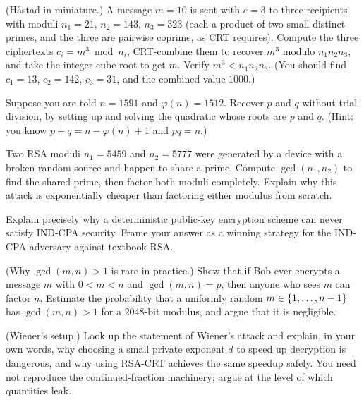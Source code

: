 \begin{exercise}
(H\r{a}stad in miniature.) A message $m=10$ is sent with $e=3$ to three recipients with moduli $n_1=21$, $n_2=143$, $n_3=323$ (each a product of two small distinct primes, and the three are pairwise coprime, as CRT requires). Compute the three ciphertexts $c_i = m^3\bmod n_i$, CRT-combine them to recover $m^3$ modulo $n_1 n_2 n_3$, and take the integer cube root to get $m$. Verify $m^3 < n_1 n_2 n_3$. (You should find $c_1=13$, $c_2=142$, $c_3=31$, and the combined value $1000$.)
\end{exercise}

\begin{exercise}
Suppose you are told $n=1591$ and $\varphi(n)=1512$. Recover $p$ and $q$ without trial division, by setting up and solving the quadratic whose roots are $p$ and $q$. (Hint: you know $p+q = n-\varphi(n)+1$ and $pq=n$.)
\end{exercise}

\begin{exercise}
Two RSA moduli $n_1 = 5459$ and $n_2 = 5777$ were generated by a device with a broken random source and happen to share a prime. Compute $\gcd(n_1,n_2)$ to find the shared prime, then factor both moduli completely. Explain why this attack is exponentially cheaper than factoring either modulus from scratch.
\end{exercise}

\begin{exercise}
Explain precisely why a deterministic public-key encryption scheme can never satisfy IND-CPA security. Frame your answer as a winning strategy for the IND-CPA adversary against textbook RSA.
\end{exercise}

\begin{exercise}
(Why $\gcd(m,n)>1$ is rare in practice.) Show that if Bob ever encrypts a message $m$ with $0 < m < n$ and $\gcd(m,n)=p$, then anyone who sees $m$ can factor $n$. Estimate the probability that a uniformly random $m\in\{1,\dots,n-1\}$ has $\gcd(m,n)>1$ for a $2048$-bit modulus, and argue that it is negligible.
\end{exercise}

\begin{exercise}
(Wiener's setup.) Look up the statement of Wiener's attack and explain, in your own words, why choosing a small private exponent $d$ to speed up decryption is dangerous, and why using RSA-CRT achieves the same speedup safely. You need not reproduce the continued-fraction machinery; argue at the level of which quantities leak.
\end{exercise}

